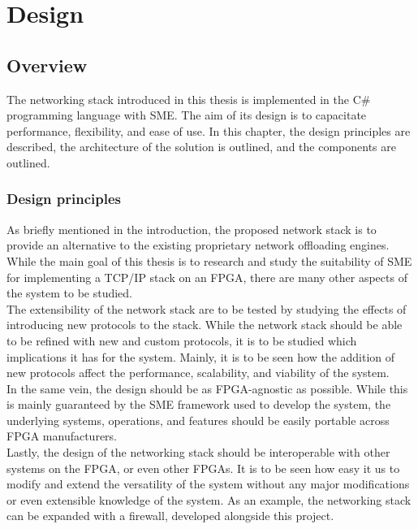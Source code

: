 \chapter{Design}
\label{chap:design}

\section{Overview}
The networking stack introduced in this thesis is implemented in the C\#
programming language with SME. The aim of its design is to capacitate performance,
flexibility, and ease of use. In this chapter, the design principles are
described, the architecture of the solution is outlined, and the components are
outlined.


\subsection{Design principles}
As briefly mentioned in the introduction, the proposed network stack is to
provide an alternative to the existing proprietary network offloading engines.
While the main goal of this thesis is to research and study the suitability of
SME for implementing a TCP/IP stack on an FPGA, there are many other aspects of the
system to be studied.\\
The extensibility of the network stack are to be tested by studying the effects
of introducing new protocols to the stack. While the network stack should be
able to be refined with new and custom protocols, it is to be studied which
implications it has for the system. Mainly, it is to be seen how the addition
of new protocols affect the performance, scalability, and viability of the
system.\\
In the same vein, the design should be as FPGA-agnostic as possible. While this is
mainly guaranteed by the SME framework used to develop the system, the underlying
systems, operations, and features should be easily portable across FPGA manufacturers.\\
Lastly, the design of the networking stack should be interoperable with other
systems on the FPGA, or even other FPGAs. It is to be seen how easy it us to modify
and extend the versatility of the system without any major modifications or
even extensible knowledge of the system. As an example, the networking stack
can be expanded with a firewall, developed alongside this
project\cite{fpga_firewall}.


